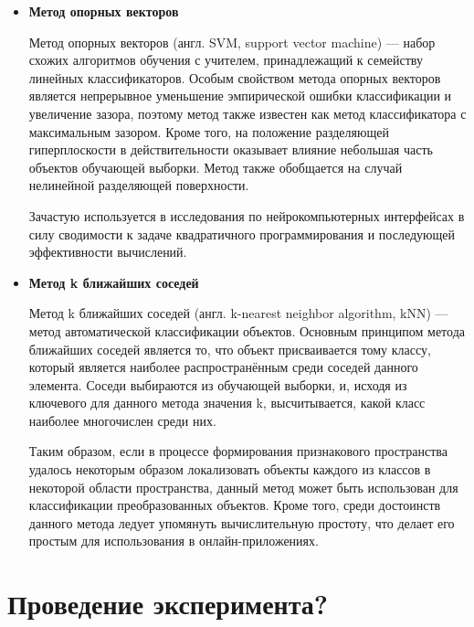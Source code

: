 \documentclass[12pt,fleqn]{article}
\begin{document}
\begin{itemize}
	\item
	{\bf Метод опорных векторов}
	\par Метод опорных векторов (англ. SVM, support vector machine) — набор схожих алгоритмов обучения с учителем, принадлежащий к семейству линейных классификаторов. Особым свойством метода опорных векторов является непрерывное уменьшение эмпирической ошибки классификации и увеличение зазора, поэтому метод также известен как метод классификатора с максимальным зазором. Кроме того, на положение разделяющей гиперплоскости в действительности оказывает влияние небольшая часть объектов обучающей выборки. Метод также обобщается на случай нелинейной разделяющей поверхности.
	\par Зачастую используется в исследования по нейрокомпьютерных интерфейсах в силу сводимости к задаче квадратичного программирования и последующей эффективности вычислений.
	\item
	{\bf Метод k ближайших соседей}
	\par Метод k ближайших соседей (англ. k-nearest neighbor algorithm, kNN) — метод автоматической классификации объектов. Основным принципом метода ближайших соседей является то, что объект присваивается тому классу, который является наиболее распространённым среди соседей данного элемента. Соседи выбираются из обучающей выборки, и, исходя из ключевого для данного метода значения k, высчитывается, какой класс наиболее многочислен среди них.
	\par Таким образом, если в процессе формирования признакового пространства удалось некоторым образом локализовать объекты каждого из классов в некоторой области пространства, данный метод может быть использован для классификации преобразованных объектов. Кроме того, среди достоинств данного метода ледует упомянуть вычислительную простоту, что делает его простым для использования в онлайн-приложениях.
	\end{itemize}

\newpage

\section{Проведение эксперимента?}
\end{document}
